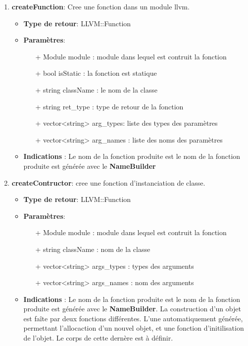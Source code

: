 \documentclass{article}
\begin{document}
  \begin{enumerate}

  \item \textbf{createFunction}: Cree une fonction dans un module llvm.
  \begin{itemize}
    \item \textbf{Type de retour}: LLVM::Function
    \item \textbf{Paramètres}:
    \begin{enumerate}
      \item[+] Module module : module dans lequel est contruit la fonction
      \item[+] bool isStatic : la fonction est statique
      \item[+] string className : le nom de la classe
      \item[+] string ret\_type : type de retour de la fonction
      \item[+] vector<string> arg\_types: liste des types des paramètres
      \item[+] vector<string> arg\_names : liste des noms des paramètres 
    \end{enumerate}
    \item \textbf{Indications} : Le nom de la fonction produite est le nom de la fonction produite est générée avec le \textbf{NameBuilder}    
  \end{itemize} 

  \item \textbf{createContructor}: cree une fonction d'instanciation de classe.
  \begin{itemize}
    \item \textbf{Type de retour}: LLVM::Function
    \item \textbf{Paramètres}:
    \begin{enumerate}
      \item[+] Module module : module dans lequel est contruit la fonction
      \item[+] string className : nom de la classe
      \item[+] vector<string> args\_types : types des arguments
      \item[+] vector<string> args\_names : nom des arguments
    \end{enumerate}
    \item \textbf{Indications} : Le nom de la fonction produite est le nom de la fonction produite est générée avec le \textbf{NameBuilder}. La construction d'un objet est faîte par deux fonctions différentes. L'une automatiquement générée, permettant l'allocaction d'un nouvel objet, et une fonction d'initilisation de l'objet. Le corps de cette dernère est à définir.
  \end{itemize}


\end{enumerate}
\end{document}
